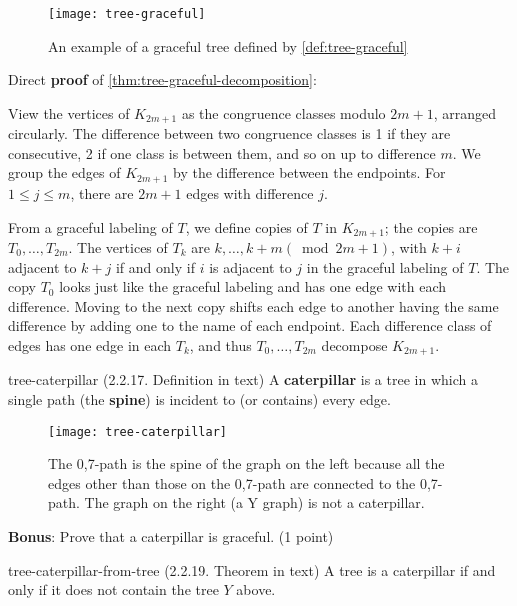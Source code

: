 \documentclass[../src/handouts/main.tex]{subfiles}
\begin{document}
\begin{figure}[htbp]
  \centering
  \texttt{[image: tree-graceful]}
  \caption{An example of a graceful tree defined by \cref{def:tree-graceful}}
  \label{fig:tree-graceful}
\end{figure}

Direct \textbf{proof} of \cref{thm:tree-graceful-decomposition}:
\begin{enumerate*}
  \item View the vertices of $K_{2 m+1}$ as the congruence classes modulo $2 m + 1$, arranged circularly. The difference between two congruence classes is 1 if they are consecutive, 2 if one class is between them, and so on up to difference $m$. We group the edges of $K_{2 m + 1}$ by the difference between the endpoints. For $1 \leq j \leq m$, there are $2 m + 1$ edges with difference $j$.
  \item From a graceful labeling of $T$, we define copies of $T$ in $K_{2 m+1}$; the copies are $T_0, \ldots, T_{2 m}$. The vertices of $T_k$ are $k, \ldots, k+m(\bmod 2 m+1)$, with $k+i$ adjacent to $k+j$ if and only if $i$ is adjacent to $j$ in the graceful labeling of $T$. The copy $T_0$ looks just like the graceful labeling and has one edge with each difference. Moving to the next copy shifts each edge to another having the same difference by adding one to the name of each endpoint. Each difference class of edges has one edge in each $T_k$, and thus $T_0, \ldots, T_{2 m}$ decompose $K_{2 m+1}$.
\end{enumerate*}

\begin{definition}{}{tree-caterpillar}
  (2.2.17. Definition in text)
  A \textbf{caterpillar} is a tree in which a single path (the \textbf{spine}) is incident to (or contains) every edge.
\end{definition}

\begin{figure}[htbp]
  \centering
  \texttt{[image: tree-caterpillar]}
  \caption{The 0,7-path is the spine of the graph on the left because all the edges other than those on the 0,7-path are connected to the 0,7-path. The graph on the right (a Y graph) is not a caterpillar.}
  \label{fig:tree-caterpillar}
\end{figure}

\textbf{Bonus}: Prove that a caterpillar is graceful. (1 point)

\begin{theorem}{}{tree-caterpillar-from-tree}
  (2.2.19. Theorem in text)
  A tree is a caterpillar if and only if it does not contain the tree $Y$ above.
\end{theorem}
\end{document}
